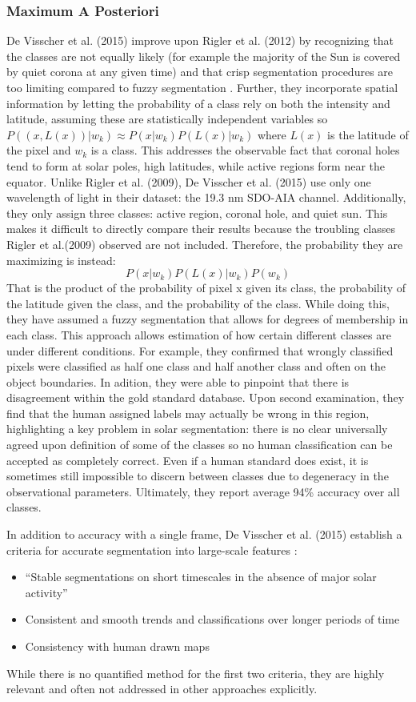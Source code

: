 \documentclass[twoside]{report}
\begin{document}
\subsubsection{Maximum A Posteriori}
De Visscher et al. (2015) improve upon Rigler et al. (2012) by recognizing that the classes are not equally likely (for example the majority of the Sun is covered by quiet corona at any given time) and that crisp segmentation procedures are too limiting compared to fuzzy segmentation \cite{visscher:2015}. Further, they incorporate spatial information by letting the probability of a class rely on both the intensity and latitude, assuming these are statistically independent variables so $P((x, L(x)) | w_k) \approx P(x|w_k) P(L(x)|w_k)$ where $L(x)$ is the latitude of the pixel and $w_k$ is a class. This addresses the observable fact that coronal holes tend to form at solar poles, high latitudes, while active regions form near the equator. Unlike Rigler et al. (2009), De Visscher et al. (2015) use only one wavelength of light in their dataset: the 19.3 nm SDO-AIA channel. Additionally, they only assign three classes: active region, coronal hole, and quiet sun. This makes it difficult to directly compare their results because the troubling classes Rigler et al.(2009) observed are not included.  Therefore, the probability they are maximizing is instead: 
\[P(x|w_k)P(L(x) | w_k) P(w_k) \]
That is the product of the probability of pixel x given its class, the probability of the latitude given the class, and the probability of the class. While doing this, they have assumed a fuzzy segmentation that allows for degrees of membership in each class. This approach allows estimation of how certain different classes are under different conditions. For example, they confirmed that wrongly classified pixels were classified as half one class and half another class and often on the object boundaries. In adition, they were able to pinpoint that there is disagreement within the gold standard database. Upon second examination, they find that the human assigned labels may actually be wrong in this region, highlighting a key problem in solar segmentation: there is no clear universally agreed upon definition of some of the classes so no human classification can be accepted as completely correct. Even if a human standard does exist, it is sometimes still impossible to discern between classes due to degeneracy in the observational parameters. Ultimately, they report average 94\% accuracy over all classes.

In addition to accuracy with a single frame, De Visscher et al. (2015) establish a criteria for accurate segmentation into large-scale features \cite{visscher:2015}:
\begin{itemize}
\item ``Stable segmentations on short timescales in the absence of major solar activity''
\item Consistent and smooth trends and classifications over longer periods of time
\item Consistency with human drawn maps
\end{itemize}
While there is no quantified method for the first two criteria, they are highly relevant and often not addressed in other approaches explicitly. 
\end{document}
